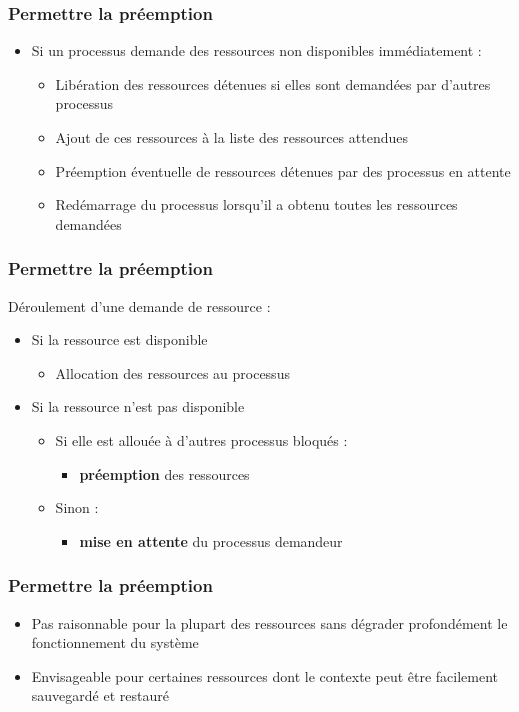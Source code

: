 \begin{frame}
\frametitle{Permettre la préemption}
\begin{itemize}
\item Si un processus demande des ressources non disponibles immédiatement :
\begin{itemize}
\item <1->Libération des ressources détenues si elles sont demandées par d’autres processus
\item <2->Ajout de ces ressources à la liste des ressources attendues
\item <3->Préemption éventuelle de ressources détenues par des processus en attente
\item <4->Redémarrage du processus lorsqu’il a obtenu toutes les ressources demandées
\end{itemize}
\end{itemize}
\end{frame}

\begin{frame}
\frametitle{Permettre la préemption}
Déroulement d'une demande de ressource :
\begin{itemize}
\item <1->Si la ressource est disponible
\begin{itemize}\item Allocation des ressources au processus\end{itemize}
\item <2->Si la ressource n'est pas disponible
\begin{itemize}
\item <3->Si elle est allouée à d’autres processus bloqués :
\begin{itemize}\item \textbf{préemption} des ressources\end{itemize}
\item <4->Sinon :
\begin{itemize}\item \textbf{mise en attente} du processus demandeur\end{itemize}
\end{itemize}
\end{itemize}
\end{frame}

\begin{frame}
\frametitle{Permettre la préemption}
\begin{itemize}
\item Pas raisonnable pour la plupart des ressources sans dégrader profondément le fonctionnement du système
\item Envisageable pour certaines ressources dont le contexte peut être facilement sauvegardé et restauré
\end{itemize}
\end{frame}

